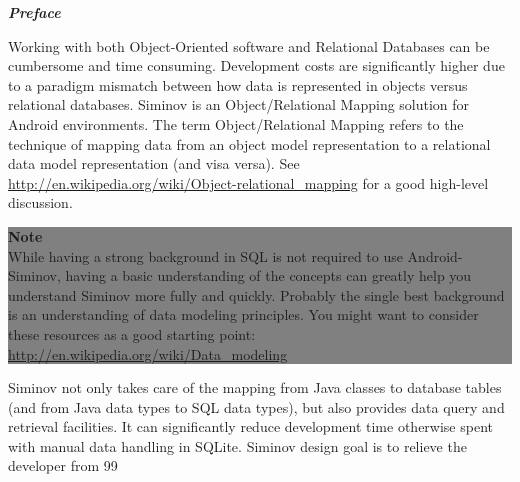 \newpage
{}
\begin{flushleft}
	\textbf{\emph{\Large{Preface}}}
\end{flushleft}

\small
Working with both Object-Oriented software and Relational Databases can be cumbersome and time consuming. Development costs are significantly higher due to a paradigm mismatch between how data is represented in objects versus relational databases. Siminov is an Object/Relational Mapping solution for Android environments. The term Object/Relational Mapping refers to the technique of mapping data from an object model representation to a relational data model representation (and visa versa). See \url{http://en.wikipedia.org/wiki/Object-relational_mapping} for a good high-level discussion.


\begin{center}
	\colorbox{grey}{
		\parbox[t]{.8\linewidth}{
			\fontsize{11pt}{11pt}\selectfont %
			\vspace*{0.7cm} %
		
			\hfill \textbf{Note} \\
			\hfill While having a strong background in SQL is not required to use Android-Siminov, having a basic understanding of the concepts can greatly help you understand Siminov more fully and quickly. Probably the single best background is an understanding of data modeling principles. You might want to consider these resources as a good starting point: \url{http://en.wikipedia.org/wiki/Data_modeling}\\
		
			\vspace*{0.7cm} %
		}
}

\end{center}


Siminov not only takes care of the mapping from Java classes to database tables (and from Java data types to SQL data types), but also provides data query and retrieval facilities. It can significantly reduce development time otherwise spent with manual data handling in SQLite. Siminov design goal is to relieve the developer from 99%

